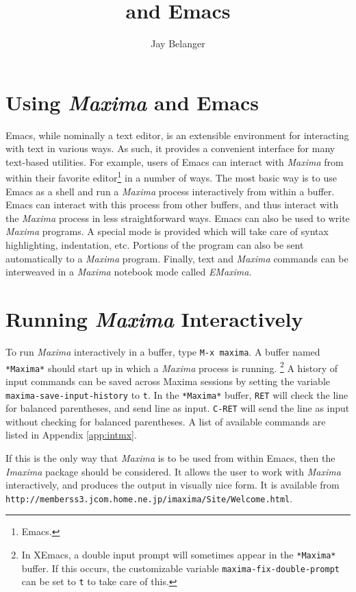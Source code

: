 \documentclass{article}
\title{\mx{} and Emacs}
\author{Jay Belanger}
\date{}
\newcommand{\emx}{\textsl{\sffamily EMaxima}}
\newcommand{\mx}{\textsl{\sffamily Maxima}}
\newcommand{\hyph}{-\hspace{0pt}}
\begin{document}
\maketitle

\section{Using \mx{} and Emacs}

Emacs, while nominally a text editor, is an extensible environment for
interacting with text in various ways.  As such, it provides a
convenient interface for many text-based utilities.  For example,
users of Emacs can interact with \mx{} from within their favorite
editor\footnote{Emacs.} in a number of ways.  The most basic way is to
use Emacs as a shell and run a \mx{} process interactively from
within a buffer.  Emacs can interact with this process from other
buffers, and thus interact with the \mx{} process in less
straightforward ways.  Emacs can also be used to write
\mx{} programs.  A special mode is provided which will take
care of syntax highlighting, indentation, etc.  Portions of the
program can also be sent automatically to a \mx{} program.
Finally, text and \mx{} commands can be interweaved in a \mx{}
notebook mode called \emx{}.

\section{Running \mx{} Interactively}

To run \mx{} interactively in a buffer, type \texttt{M-x maxima}.  A
buffer named \texttt{*Maxima*} should start up in which a \mx{}
process is running.%
\footnote{In XEmacs, a double input prompt will sometimes appear in
  the \texttt{*Maxima*} buffer.  If this occurs, the customizable
  variable \texttt{maxima\hyph{}fix\hyph{}double\hyph{}prompt} can be set to \texttt{t}
  to take care of this.}
A history of input commands can be saved across Maxima sessions by
setting the variable \texttt{maxima\hyph{}save\hyph{}input\hyph{}history} to \texttt{t}.
In the \texttt{*Maxima*} buffer, \texttt{RET} will check the line for
balanced parentheses, and send line as input.  \texttt{C-RET} will
send the line as input without checking for balanced parentheses.  A
list of available commands are listed in Appendix \ref{app:intmx}.

If this is the only way that \mx{} is to be used from within Emacs,
then the \textsl{Imaxima} package should be considered.  It allows the
user to work with \mx{} interactively, and produces the output in
visually nice form.  It is available from
\verb+http://memberss3.jcom.home.ne.jp/imaxima/Site/Welcome.html+.
\end{document}
